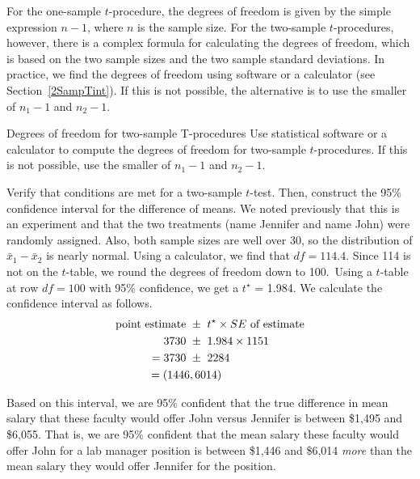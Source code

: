 For the one-sample $t$-procedure, the degrees of freedom is given by the simple expression $n-1$, where $n$ is the sample size.  For the two-sample $t$-procedures, however, there is a complex formula for calculating the degrees of freedom, which is based on the two sample sizes and the two sample standard deviations.  In practice, we find the degrees of freedom using software or a calculator (see Section~\ref{2SampTint}).  If this is not possible, the alternative is to use the smaller of $n_1-1$ and $n_2-1$.

\begin{onebox}
{Degrees of freedom for two-sample T-procedures}
Use statistical software or a calculator to compute the degrees of freedom for two-sample \mbox{$t$-procedures}.  If this is not possible, use the smaller of $n_1-1$ and $n_2-1$.
\end{onebox}

\begin{examplewrap}
\begin{nexample}{Verify that conditions are met for a two-sample $t$-test.  Then, construct the 95\% confidence interval for the difference of means.}
We noted previously that this is an experiment and that the two treatments (name Jennifer and name John) were randomly assigned.  Also, both sample sizes are well over 30, so the distribution of $\bar{x}_1-\bar{x}_2$ is nearly normal.  Using a calculator, we find that $df= 114.4$.  Since 114 is not on the $t$-table, we round the degrees of freedom down to 100.\footnotemark  \ Using a $t$-table at row $df=100$ with 95\% confidence, we get a $t^{\star}$ = 1.984. We calculate the confidence interval as follows. 
\begin{align*}
\text{point estimate } &\pm \ t^{\star}\times SE \text{ of estimate}\\
3730\ &\pm \ 1.984\times 1151{}\\
= 3730\ &\pm \ 2284\\
= (1446&, 6014)
\end{align*}
\end{nexample}
\end{examplewrap}

Based on this interval, we are 95\% confident that the true difference in mean salary that these faculty would offer John versus Jennifer is between \$1,495 and \$6,055.  That is, we are 95\% confident that the mean salary these faculty would offer John for a lab manager position is between \$1,446 and \$6,014 \emph{more} than the mean salary they would offer Jennifer for the position.

